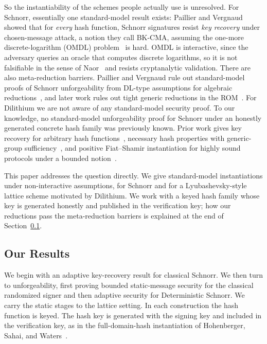 So the instantiability of the schemes people actually use is unresolved. For Schnorr, essentially one standard-model result exists: Paillier and Vergnaud~\cite{AC:PaiVer05} showed that for \emph{every} hash function, Schnorr signatures resist \emph{key recovery} under chosen-message attack, a notion they call BK-CMA, assuming the one-more discrete-logarithm (OMDL) problem~\cite{JC:BNPS03} is hard. OMDL is interactive, since the adversary queries an oracle that computes discrete logarithms, so it is not falsifiable in the sense of Naor~\cite{C:Naor03} and resists cryptanalytic validation. There are also meta-reduction barriers. Paillier and Vergnaud rule out standard-model proofs of Schnorr unforgeability from DL-type assumptions for algebraic reductions~\cite{AC:PaiVer05}, and later work rules out tight generic reductions in the ROM~\cite{C:GarBhaLok08,EC:Seurin12,JC:FleJagSch19}. For Dilithium we are not aware of any standard-model security proof. To our knowledge, no standard-model unforgeability proof for Schnorr under an honestly generated concrete hash family was previously known. Prior work gives key recovery for arbitrary hash functions~\cite{AC:PaiVer05}, necessary hash properties with generic-group sufficiency~\cite{JMC:NevSmaWar09}, and positive Fiat--Shamir instantiation for highly sound protocols under a bounded notion~\cite{DBLP:journals/tcs/MittelbachV18}.

This paper addresses the question directly. We give standard-model instantiations under non-interactive assumptions, for Schnorr and for a Lyubashevsky-style lattice scheme motivated by Dilithium. We work with a keyed hash family whose key is generated honestly and published in the verification key; how our reductions pass the meta-reduction barriers is explained at the end of Section~\ref{sec-results}.

\subsection{Our Results} \label{sec-results}

We begin with an adaptive key-recovery result for classical Schnorr. We then turn to unforgeability, first proving bounded static-message security for the classical randomized signer and then adaptive security for Deterministic Schnorr. We carry the static stages to the lattice setting. In each construction the hash function is keyed. The hash key is generated with the signing key and included in the verification key, as in the full-domain-hash instantiation of Hohenberger, Sahai, and Waters~\cite{EC:HohSahWat14}.

